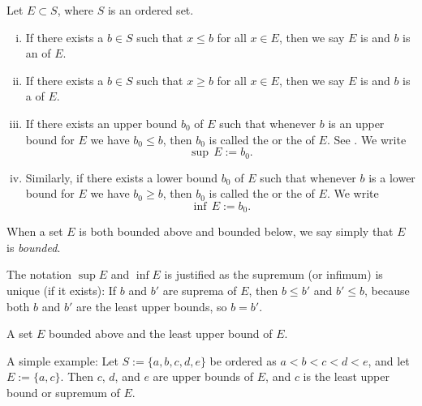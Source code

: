 \begin{defn}
Let $E \subset S$, where $S$ is an ordered set.
\begin{enumerate}[(i)]
\item If there exists a $b \in S$ such that $x \leq b$ for all $x \in E$,
then we say $E$ is \emph{} and $b$
is an \emph{} of $E$.
\item If there exists a $b \in S$ such that $x \geq b$ for all $x \in E$,
then we say $E$ is \emph{} and $b$
is a \emph{} of $E$.
\item If there exists an upper bound $b_0$ of $E$ such that whenever
$b$ is an upper bound for $E$ we have $b_0 \leq b$, then $b_0$
is called the \emph{} or
the \emph{}
of $E$.  See .  We write
\begin{equation*}
\sup\, E := b_0  .
\end{equation*}
\item Similarly, if there exists a lower bound $b_0$ of $E$ such that whenever
$b$ is a lower bound for $E$ we have $b_0 \geq b$, then $b_0$
is called the \emph{} or
the \emph{}
of $E$.  We write
\begin{equation*}
\inf\, E := b_0  .
\end{equation*}
\end{enumerate}
When a set $E$ is both bounded above and bounded below, we say simply that
$E$ is \emph{bounded}.
\end{defn}

The notation $\sup E$ and $\inf E$ is justified as
the
supremum (or infimum) is unique (if it exists): If $b$ and
$b'$ are suprema of $E$, then $b \leq b'$ and $b' \leq b$, because both
$b$ and $b'$ are the least upper bounds, so $b=b'$.


\begin{myfigureht}

\caption{A set $E$ bounded above and the least upper bound of $E$.\label{fig:lub}}
\end{myfigureht}

A simple example:
Let $S := \{ a, b, c, d, e \}$ be ordered as $a < b < c < d < e$, and
let $E := \{ a, c \}$.  Then $c$, $d$, and $e$ are upper bounds of $E$, and
$c$ is the least upper bound or supremum of $E$.

